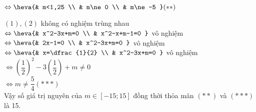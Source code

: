 \begin{ex}
{		$\Leftrightarrow \heva{& m<1,25 \\ & m\ne 0 \\ & m\ne -5 }(**) $ \\
		\item  $ (1),(2) $  không có nghiệm trùng nhau  $ \Leftrightarrow \heva{& x^2-3x+m=0 \\ & x^2-x+m-1=0 } $
		vô nghiệm\\
		$ \Leftrightarrow \heva{& 2x-1=0 \\ & x^2-3x+m=0 } $  vô nghiệm\\
		$ \Leftrightarrow \heva{& x=\dfrac{1}{2} \\ & x^2-3x+m=0 } $  vô nghiệm\\
		$ \Leftrightarrow \left(\dfrac{1}{2}\right)^2-3\left(\dfrac{1}{2}\right)+m\ne 0 $ \\
		$ \Leftrightarrow m\ne \dfrac{5}{4}(***) $ \\
		Vậy số giá trị nguyên của  $  m\in [ -15;15 ] $  đồng thời thỏa mãn  $ (**) $  và  $ (***) $  là 15.}
\end{ex}
